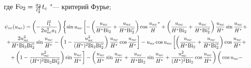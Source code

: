 где ${\rm Fo}_2 = \frac{a_2 }{l_2^2 }t_c $ "--- критерий Фурье;

\begin{multline}

\psi _{vc} (u_{nc} ) = \left(- \frac{l_1^2 }{2u_{nc}^2 a_1 } \right)

\left\{ 

\sin u_{nc} \left[  - \left( \frac{u_{nc} }{H^\ast {\rm Bi}_2 } 

+ \frac{u_{nc} }{H^\ast {\rm Bi}_2^v } \right)

\cos  \frac{u_{nc} }H^\ast 

 +  

\left( {\frac{u_{nc} }{H^\ast {\rm Bi}_2 } + \frac{u_{nc} }{H^\ast {\rm Bi}_2^v }} 

\right)\frac{u_{nc} }{H^\ast }\sin \frac{u_{nc} }{H^\ast } + \right.\right.

\\ 

 \left.

+ \frac{2u_{nc}^2 }{H^\ast {\rm Bi}_2 {\rm Bi}_2^v }

\sin \frac{u_{nc} }{H^\ast } -    

\left( 1 - \frac{u_{nc}^2 }{(H^\ast )^2{\rm Bi}_2 {\rm Bi}_2^v } \right)

\frac{u_{nc} }{H^\ast }\cos \frac{u_{nc} }{H^\ast } \right] - u_{nc} \cos u_{nc} 

\left[ \left( \frac{u_{nc} }{H^\ast {\rm Bi}_2 } + \frac{u_{nc} }{H^\ast {\rm Bi}_2^v } \right) 

 \cos \frac{u_{nc} }{H^\ast } +

\right.

\\

\left. + 

\left( 1 - \frac{u_{nc}^2 }{(H^\ast )^2{\rm Bi}_2 {\rm Bi}_2^v } \right)

\sin \frac{u_{nc} }{H^\ast } \right] - 

\left( \frac{u_{nc} }{H^\ast }\sin \frac{u_{nc} }{H^\ast } + 

\frac{u_{nc} }{H^\ast {\rm Bi}_2 }%



\sin \frac{u_{nc} }{H^\ast } + \frac{u_{nc}^2 }{(H^\ast )^2{\rm Bi}_2 }\cos 

\frac{u_{nc} }{H^\ast } \right) \bigg( \cos u_{nc} -



\end{multline}
